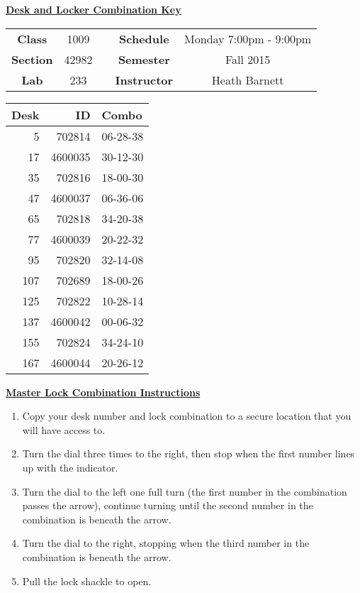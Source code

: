 \documentclass[12pt]{article}
\begin{document}
\thispagestyle{empty}

\begin{center}
	{\huge\textbf{\underline{ Desk and Locker Combination Key}}}
\end{center}


\begin{table}[h]
  \centering
  \begin{tabular}{ccccc}

  \textbf{Class} & 1009 & {\qquad} &\textbf{Schedule} & Monday 7:00pm - 9:00pm \\
  \textbf{Section} & 42982 & {\qquad} & \textbf{Semester} & Fall 2015 \\
  \textbf{Lab} & 233 & {\qquad} & \textbf{Instructor} & Heath Barnett \\
  \end{tabular}
\end{table}
 \vspace{0.1in}
\begin{minipage}{0.4\textwidth}

\begin{tabular}{rrl}
\toprule
 Desk &       ID &     Combo \\
\midrule
    5 &   702814 &  06-28-38 \\
   17 &  4600035 &  30-12-30 \\
   35 &   702816 &  18-00-30 \\
   47 &  4600037 &  06-36-06 \\
   65 &   702818 &  34-20-38 \\
   77 &  4600039 &  20-22-32 \\
   95 &   702820 &  32-14-08 \\
  107 &   702689 &  18-00-26 \\
  125 &   702822 &  10-28-14 \\
  137 &  4600042 &  00-06-32 \\
  155 &   702824 &  34-24-10 \\
  167 &  4600044 &  20-26-12 \\
\bottomrule
\end{tabular}


\end{minipage}
\begin{minipage}{0.4\textwidth}
\underline{{\large \textbf{Master Lock Combination Instructions}}}
\begin{enumerate}
\item Copy your desk number and lock combination to a secure location that you will have access to.
\item Turn the dial three times to the right, then stop when the first number lines up with the indicator.
\item Turn the dial to the left one full turn (the first number in the combination passes the arrow), continue turning until the second number in the combination is beneath the arrow.
\item Turn the dial to the right, stopping when the third number in the combination is beneath the arrow.
\item Pull the lock shackle to open.
\end{enumerate}
\end{minipage}
\end{document}
